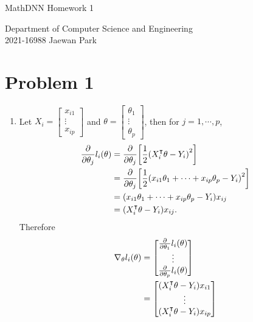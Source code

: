 \documentclass[10pt]{article}
\begin{document}
\begin{center}
    {\LARGE MathDNN Homework 1} \\
\end{center}
\begin{flushright}
    Department of Computer Science and Engineering \\
    2021-16988 Jaewan Park
\end{flushright}

\section*{Problem 1}
\begin{enumerate}[leftmargin=*, label={(\alph*)}]
    \item Let $X_i = \begin{bmatrix}
        x_{i1} \\ \vdots \\ x_{ip}
    \end{bmatrix}$ and $\theta = \begin{bmatrix}
        \theta_1 \\ \vdots \\ \theta_p
    \end{bmatrix}$, then for $j = 1, \cdots, p$, 
    \begin{align*}
        \frac{\partial}{\partial\theta_j}l_i(\theta) &= \frac{\partial}{\partial\theta_j}\qty[\frac{1}{2}\qty(X_i^\intercal \theta - Y_i)^2]\\
        &= \frac{\partial}{\partial\theta_j}\qty[\frac{1}{2}\qty(x_{i1}\theta_1 + \cdots + x_{ip}\theta_p - Y_i)^2] \\
        &= \qty(x_{i1}\theta_1 + \cdots + x_{ip}\theta_p - Y_i)x_{ij} \\
        &= \qty(X_i^\intercal \theta - Y_i)x_{ij}.
    \end{align*}
    Therefore
    \begin{align*}
        \nabla_\theta l_i(\theta) &= \begin{bmatrix}
            \frac{\partial}{\partial\theta_1}l_i(\theta) \\ \vdots \\ \frac{\partial}{\partial\theta_p}l_i(\theta)
        \end{bmatrix} \\
        &= \begin{bmatrix}
            \qty(X_i^\intercal \theta - Y_i)x_{i1} \\ \vdots \\ \qty(X_i^\intercal \theta - Y_i)x_{ip}

\end{bmatrix}
\end{align*}
\end{enumerate}
\end{document}
